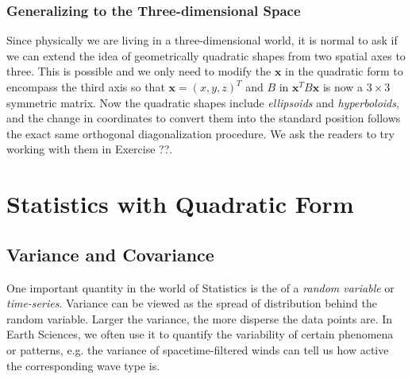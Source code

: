 \subsubsection{Generalizing to the Three-dimensional Space}
Since physically we are living in a three-dimensional world, it is normal to ask if we can extend the idea of geometrically quadratic shapes from two spatial axes to three. This is possible and we only need to modify the $\textbf{x}$ in the quadratic form to encompass the third axis so that $\textbf{x} = (x,y,z)^T$ and $B$ in $\textbf{x}^TB\textbf{x}$ is now a $3 \times 3$ symmetric matrix. Now the quadratic shapes include \textit{ellipsoids} and \textit{hyperboloids}, and the change in coordinates to convert them into the standard position follows the exact same orthogonal diagonalization procedure. We ask the readers to try working with them in Exercise ??.

\section{Statistics with Quadratic Form}

\subsection{Variance and Covariance}
\label{section:variancesec}
One important quantity in the world of Statistics is the  of a \textit{random variable} or \textit{time-series}. Variance can be viewed as the spread of distribution behind the random variable. Larger the variance, the more disperse the data points are. In Earth Sciences, we often use it to quantify the variability of certain phenomena or patterns, e.g. the variance of spacetime-filtered winds can tell us how active the corresponding wave type is.

